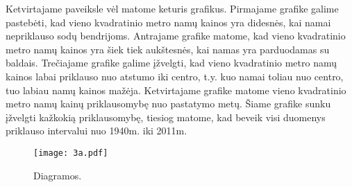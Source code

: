 \documentclass[a4paper]{article}
\begin{document}
\hspace*{0,01cm}Ketvirtajame paveiksle vėl matome keturis grafikus. Pirmajame grafike galime pastebėti, kad vieno kvadratinio metro namų kainos yra didesnės, kai namai nepriklauso sodų bendrijoms. Antrajame grafike matome, kad vieno kvadratinio metro namų kainos yra šiek tiek aukštesnės, kai namas yra parduodamas su baldais. Trečiajame grafike galime įžvelgti, kad vieno kvadratinio metro namų kainos labai priklauso nuo atstumo iki centro, t.y. kuo namai toliau nuo centro, tuo labiau namų kainos mažėja. Ketvirtajame grafike matome vieno kvadratinio metro namų kainų priklausomybę nuo pastatymo metų. Šiame grafike sunku įžvelgti kažkokią priklausomybę, tiesiog matome, kad beveik visi duomenys priklauso intervalui nuo 1940m. iki 2011m.
\begin{figure}[H]
  \caption{Diagramos.}
  \centering
    \texttt{[image: 3a.pdf]}
\end{figure}
\end{document}
